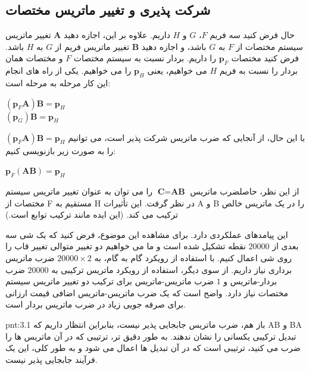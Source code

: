 \subsection{\textbf{شرکت پذیری و تغییر ماتریس مختصات}}
{
    \Large
    \begin{spacing}{1.5}
        حال فرض کنید سه فریم $F$، $G$ و $H$ داریم. علاوه بر این، اجازه دهید $\textbf{A}$
        تغییر ماتریس سیستم مختصات از $F$ به $G$ باشد،
        و اجازه دهید $\textbf{B}$ تغییر ماتریس فریم از $G$ به $H$ باشد. فرض کنید مختصات $\textbf{p}_{F}$ را داریم.
        بردار نسبت به سیستم مختصات $F$ و مختصات همان بردار را نسبت به فریم $H$ می خواهیم، ​​یعنی $\textbf{p}_{H}$ را می خواهیم.
        یکی از راه های انجام این کار مرحله به مرحله است:

        \begin{center}
            $(\textbf{p}_{F}\textbf{A})\textbf{B}=\textbf{p}_{H}$ \\
            $(\textbf{p}_{G})\textbf{B}=\textbf{p}_{H}$
        \end{center}

        با این حال، از آنجایی که ضرب ماتریس شرکت پذیر است، می توانیم $(\textbf{p}_{F}\textbf{A})\textbf{B}=\textbf{p}_{H}$ را به صورت زیر بازنویسی کنیم:

        \begin{center}
            $\textbf{p}_{F}(\textbf{A}\textbf{B})=\textbf{p}_{H}$
        \end{center}

        از این نظر، حاصلضرب ماتریس $\textbf{C}=\textbf{AB}$ را می توان به عنوان تغییر ماتریس سیستم مختصات از F مستقیم به H در نظر گرفت.
        این تأثیرات A و B را در یک ماتریس خالص ترکیب می کند. (این ایده مانند ترکیب توابع است.)

        این پیامدهای عملکردی دارد. برای مشاهده این موضوع، فرض کنید که یک شی سه بعدی از $20000$ نقطه تشکیل شده است و ما می خواهیم دو تغییر متوالی تغییر قاب را روی شی اعمال کنیم.
        با استفاده از رویکرد گام به گام، به $20000\times 2$ ضرب ماتریس برداری نیاز داریم. از سوی دیگر، استفاده از رویکرد ماتریس ترکیبی به $20000$ ضرب بردار-ماتریس و $1$ ضرب ماتریس-ماتریس برای ترکیب دو تغییر ماتریس سیستم مختصات نیاز دارد.
        واضح است که یک ضرب ماتریس-ماتریس اضافی قیمت ارزانی برای صرفه جویی زیاد در ضرب ماتریس بردار است.

        \begin{point}{pnt:3.1}
            \Large
            باز هم، ضرب ماتریس جابجایی پذیر نیست، بنابراین انتظار داریم که AB و BA تبدیل ترکیبی یکسانی را نشان ندهند.
            به طور دقیق تر، ترتیبی که در آن ماتریس ها را ضرب می کنید، ترتیبی است که در آن تبدیل ها اعمال می شود و به طور کلی، این یک فرآیند جابجایی پذیر نیست.
        \end{point}

    \end{spacing}
}

